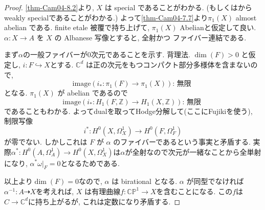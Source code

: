\documentclass[dvipdfmx,a4paper,11pt]{article} %
\theoremstyle{definition}
\theoremstyle{remark}
\numberwithin{equation}{section}
\newcommand{\Z}{\mathbb{Z}}
\newcommand{\C}{\mathbb{C}}
\begin{document}
\begin{proof}
\ref{thm-Cam04-8.2}より,  \(X\) は special であることがわかる. (もしくは\cite{KO75}からweakly specialであることがわかる.)
よって\ref{thm-Cam04-7.7}より\(\pi_1(X)\) almost abelian である.
finite etale 被覆で持ち上げて, $\pi_1(X)$ Abelianと仮定して良い. 
\(\alpha : X\to A\) を \(X\) の Albanese 写像とすると, 全射かつ ファイバー連結である.

まず$\alpha$の一般ファイバーが0次元であることを示す. 
背理法. \(\dim(F)>0\) と仮定し, 
$i : F \hookrightarrow X$とする. 
\(\mathbb{C}^d\) は正の次元をもつコンパクト部分多様体を含まないので,  
\[\mathrm{image}(i_{*} : \pi_1(F)\to\pi_1(X))
\text{: 無限 }
\] となる. 
\(\pi_1(X)\) が abelian であるので
\[\mathrm{image}(i_{*} : H_1(F, \Z)\to H_1(X, \Z))
\text{: 無限 }
\] 
であることもわかる. 
よってdualを取ってHodge分解して(ここにFujikiを使う), 制限写像
\[
i^{*}: H^0(X,\Omega_X^1)\longrightarrow H^0(F,\Omega_F^1)
\]
が零でない. 
しかしこれは \(F\) が \(\alpha\) のファイバーであるという事実と矛盾する. 
実際$\alpha^{*} : H^0(A,\Omega_A^{1})\to H^0(X,\Omega_X^1) $は$\alpha$が全射なので次元が一緒なことから全単射になり, $\alpha^{*} \omega|_{F}=0$となるためである. 

以上より\(\dim(F)=0\)なので, \(\alpha\) は birational となる. 
 \(\alpha\) が同型でなければ $\alpha^{-1} : A \dashrightarrow X$を考えれば, \(X\) は有理曲線$f : \C\mathbb{P}^1 \to X$を含むことになる. この$f$は$C \to \C^{d}$に持ち上がるが, これは定数になり矛盾する. 
 \end{proof}
\end{document}
